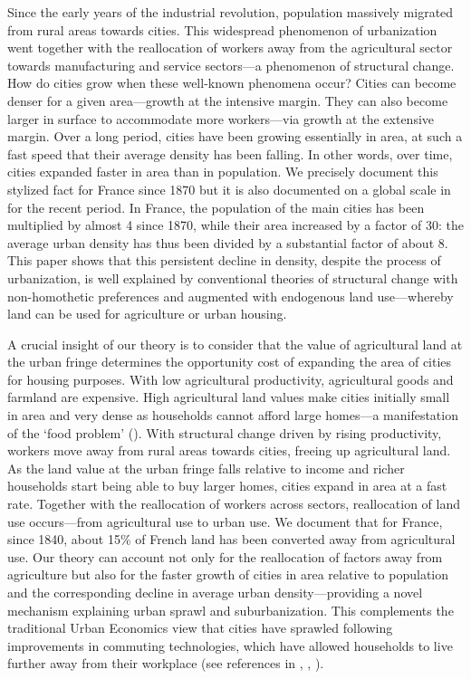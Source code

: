\documentclass[./20250130-paper.tex]{subfiles}
\begin{document}
	
	Since the early years of the industrial revolution, population massively migrated from rural areas towards cities. This widespread phenomenon of urbanization went together with the reallocation of workers away from the agricultural sector towards manufacturing and service sectors---a phenomenon of structural change. How do cities grow when these well-known phenomena occur? Cities can become denser for a given area---growth at the intensive margin. They can also become larger in surface to accommodate more workers---via growth at the extensive margin.  Over a long period, cities have been growing essentially in area, at such a fast speed that their average density has been falling. In other words, over time, cities expanded faster in area than in population. We precisely document this stylized fact for France since 1870 but it is also documented on a global scale in \cite{angel2010persistent} for the recent period. In France, the population of the main cities has been multiplied by almost 4 since 1870, while their area increased by a factor of 30: the average urban density has thus been divided by a substantial factor of about 8. This paper shows that this persistent decline in density, despite the process of urbanization, is well explained by conventional theories of structural change with non-homothetic preferences and augmented with endogenous land use---whereby land can be used for agriculture or urban housing.
	
	A crucial insight of our theory is to consider that the value of agricultural land at the urban fringe determines the opportunity cost of expanding the area of cities for housing purposes. With low agricultural productivity, agricultural goods and farmland are expensive. High agricultural land values make cities initially small in area and very dense as households cannot afford large homes---a manifestation of the `food problem' (\cite{schultz1953}). With structural change driven by rising productivity, workers move away from rural areas towards cities, freeing up agricultural land. As the land value at the urban fringe falls relative to income and richer households start being able to buy larger homes, cities expand in area at a fast rate. Together with the reallocation of workers across sectors, reallocation of land use occurs---from agricultural use to urban use. We document that for France, since 1840, about 15\% of French land has been converted away from agricultural use. Our theory can account not only for the reallocation of factors away from agriculture but also for the faster growth of cities in area relative to population and the corresponding decline in average urban density---providing a novel mechanism explaining urban sprawl and suburbanization. This complements the traditional Urban Economics view that cities have sprawled following improvements in commuting technologies, which have allowed households to live further away from their workplace (see references in \cite{glaeser2004sprawl}, \cite{heblichreddingsturm2018}, \cite{redding2021}). 
	
\end{document}
